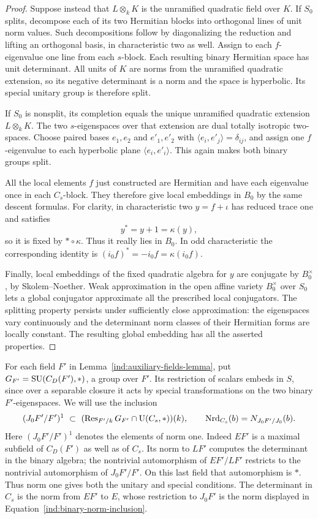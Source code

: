 \begin{proof}
Suppose instead that $L\otimes_kK$ is the unramified quadratic
field over $K$.  If $S_0$ splits, decompose each of its two
Hermitian blocks into orthogonal lines of unit norm values.
Such decompositions follow by diagonalizing the reduction and
lifting an orthogonal basis, in characteristic two as well.
Assign to each $f$-eigenvalue one line from each $s$-block.
Each resulting binary Hermitian space has unit determinant.
All units of $K$ are norms from the unramified quadratic
extension, so its negative determinant is a norm and the space
is hyperbolic.  Its special unitary group is therefore split.

If $S_0$ is nonsplit, its completion equals the unique unramified
quadratic extension $L\otimes_kK$.  The two $s$-eigenspaces over
that extension are dual totally isotropic two-spaces.
Choose paired bases $e_1,e_2$ and $e'_1,e'_2$ with
$\langle e_i,e'_j\rangle=\delta_{ij}$, and assign one
$f$-eigenvalue to each hyperbolic plane
$\langle e_i,e'_i\rangle$.  This again makes both binary
groups split.

All the local elements $f$ just constructed are Hermitian and
have each eigenvalue once in each $C_s$-block.  They therefore
give local embeddings in $B_0$ by the same descent formulas.
For clarity, in characteristic two $y=f+\iota$ has reduced
trace one and satisfies
\[
 y^*=y+1=\kappa(y),
\]
so it is fixed by $*\circ\kappa$.  Thus it really lies in $B_0$.
In odd characteristic the corresponding identity is
$(i_0f)^*=-i_0f=\kappa(i_0f)$.

Finally, local embeddings of the fixed quadratic algebra for
$y$ are conjugate by $B_0^\times$, by Skolem--Noether.
Weak approximation in the open affine variety $B_0^\times$
over $S_0$ lets a global conjugator approximate all the prescribed
local conjugators.  The splitting property persists under
sufficiently close approximation: the eigenspaces vary
continuously and the determinant norm classes of their Hermitian
forms are locally constant.  The resulting global embedding
has all the asserted properties.
\end{proof}

For each field $F'$ in Lemma~\ref{ind:auxiliary-fields-lemma},
put $G_{F'}=\operatorname{SU}(C_D(F'),*)$, a group over $F'$.
Its restriction of scalars embeds in $S$, since over a separable
closure it acts by special transformations on the two binary
$F'$-eigenspaces.  We will use the inclusion
\begin{equation}\label{ind:binary-norm-inclusion}
 (J_0F'/F')^1\ \subset\
 (\operatorname{Res}_{F'/k}G_{F'}\cap\operatorname{U}(C_s,*))(k),
 \qquad
 \operatorname{Nrd}_{C_s}(b)=N_{J_0F'/J_0}(b).
\end{equation}
Here $(J_0F'/F')^1$ denotes the elements of norm one.
Indeed $EF'$ is a maximal subfield of $C_D(F')$ as well as of
$C_s$.  Its norm to $LF'$ computes the determinant in the
binary algebra; the nontrivial automorphism of $EF'/LF'$
restricts to the nontrivial automorphism of $J_0F'/F'$.
On this last field that automorphism is $*$.
Thus norm one gives both the unitary and special conditions.
The determinant in $C_s$ is the norm from $EF'$ to $E$,
whose restriction to $J_0F'$ is the norm displayed in
Equation~\eqref{ind:binary-norm-inclusion}.

